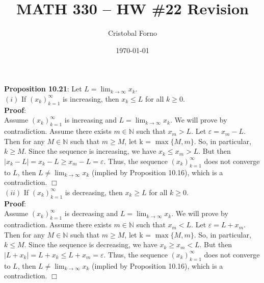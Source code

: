 \documentclass[12pt]{article}
\title{MATH 330 -- HW \#22 Revision}
\author{Cristobal Forno}
\date{\today}
\begin{document}
\maketitle

\textbf{Proposition 10.21}: Let $L = \lim_{k\to\infty} x_k.$\\
$(i)$ If $(x_k)_{k=1}^\infty$ is increasing, then $x_k \leq L$ for all $k \geq 0$.\\
\noindent
\textbf{Proof}:\\
\indent
Assume $(x_k)_{k=1}^\infty$ is increasing and $L = \lim_{k\to\infty} x_k$. We
will prove by contradiction. Assume there exists $m \in \mathbb{N}$ such that $x_m
> L$. Let $\varepsilon = x_m - L$. Then for any $M \in \mathbb{N}$ such that $m
\geq M$, let k = $\max\{M, m\}$. So, in particular, $k \geq M$. Since the
sequence is increasing, we have $x_k \leq x_m > L$. But then $|x_k - L| = x_k -
L \geq x_m - L = \varepsilon$. Thus, the sequence $(x_k)_{k=1}^\infty$ does not
converge to $L$, then $L \neq \lim_{k\to\infty} x_k$ (implied by Proposition
10.16),  which is a contradiction. $\Box$ \\

\noindent
$(ii)$ If $(x_k)_{k=1}^\infty$ is decreasing, then $x_k \geq L$ for all $k \geq 0$.\\
\noindent
\textbf{Proof}:\\
\indent
Assume $(x_k)_{k=1}^\infty$ is decreasing and $L = \lim_{k\to\infty}x_k$. We
will prove by contradiction. Assume there exists $m \in \mathbb{N}$ such that
$x_m < L$. Let $\varepsilon = L + x_m$. Then for any $M \in \mathbb{N}$ such
that  $m \geq M$, let k =
$\max\{M, m\}$. So, in particular, $k \leq M$. Since the sequence is decreasing,
we have $x_k \geq x_m < L$. But then $|L+x_k| =  L+x_k \leq L+x_m=\varepsilon$.
Thus, the sequence $(x_k)_{k=1}^\infty$ does not converge to $L$, then $L \neq
\lim_{k\to\infty} x_k$ (implied by Proposition 10.16), which is a contradiction.
$\Box$
\end{document}
